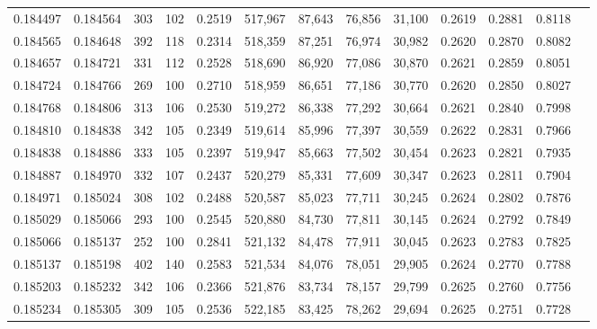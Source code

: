 \begin{tabular}{rrrrrrrrrrrrr}
0.184497 & 0.184564 &   303 & 102 &                                     0.2519 & 517,967 &  87,643 &  76,856 &  31,100 & 0.2619 & 0.2881 & 0.8118 \\
0.184565 & 0.184648 &   392 & 118 &                                     0.2314 & 518,359 &  87,251 &  76,974 &  30,982 & 0.2620 & 0.2870 & 0.8082 \\
0.184657 & 0.184721 &   331 & 112 &                                     0.2528 & 518,690 &  86,920 &  77,086 &  30,870 & 0.2621 & 0.2859 & 0.8051 \\
0.184724 & 0.184766 &   269 & 100 &                                     0.2710 & 518,959 &  86,651 &  77,186 &  30,770 & 0.2620 & 0.2850 & 0.8027 \\
0.184768 & 0.184806 &   313 & 106 &                                     0.2530 & 519,272 &  86,338 &  77,292 &  30,664 & 0.2621 & 0.2840 & 0.7998 \\
0.184810 & 0.184838 &   342 & 105 &                                     0.2349 & 519,614 &  85,996 &  77,397 &  30,559 & 0.2622 & 0.2831 & 0.7966 \\
0.184838 & 0.184886 &   333 & 105 &                                     0.2397 & 519,947 &  85,663 &  77,502 &  30,454 & 0.2623 & 0.2821 & 0.7935 \\
0.184887 & 0.184970 &   332 & 107 &                                     0.2437 & 520,279 &  85,331 &  77,609 &  30,347 & 0.2623 & 0.2811 & 0.7904 \\
0.184971 & 0.185024 &   308 & 102 &                                     0.2488 & 520,587 &  85,023 &  77,711 &  30,245 & 0.2624 & 0.2802 & 0.7876 \\
0.185029 & 0.185066 &   293 & 100 &                                     0.2545 & 520,880 &  84,730 &  77,811 &  30,145 & 0.2624 & 0.2792 & 0.7849 \\
0.185066 & 0.185137 &   252 & 100 &                                     0.2841 & 521,132 &  84,478 &  77,911 &  30,045 & 0.2623 & 0.2783 & 0.7825 \\
0.185137 & 0.185198 &   402 & 140 &                                     0.2583 & 521,534 &  84,076 &  78,051 &  29,905 & 0.2624 & 0.2770 & 0.7788 \\
0.185203 & 0.185232 &   342 & 106 &                                     0.2366 & 521,876 &  83,734 &  78,157 &  29,799 & 0.2625 & 0.2760 & 0.7756 \\
0.185234 & 0.185305 &   309 & 105 &                                     0.2536 & 522,185 &  83,425 &  78,262 &  29,694 & 0.2625 & 0.2751 & 0.7728 \\

\end{tabular}
